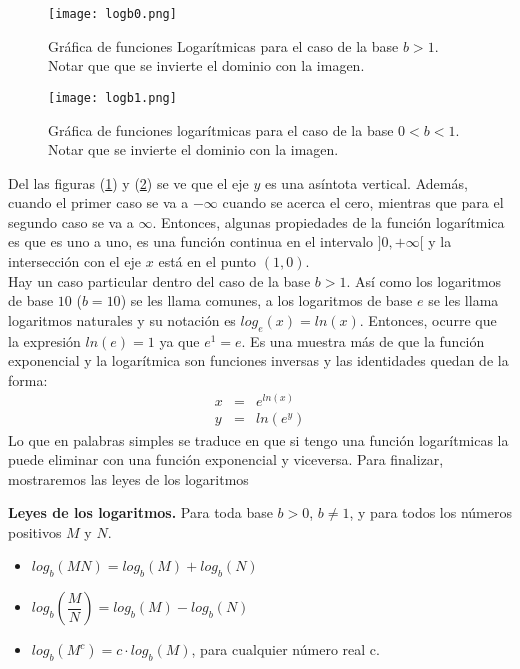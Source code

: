  \begin{center}
\begin{figure}[h!]
\centering
\texttt{[image: logb0.png]}
\caption[Gráfica de funciones logarítmicas para el caso de la base $b>1$]{Gráfica de funciones Logarítmicas para el caso de la base $b>1$. Notar que que se invierte el dominio con la imagen.} \label{logb0}
\end{figure}
\end{center}

 \begin{center}
\begin{figure}[h!]
\centering
\texttt{[image: logb1.png]}
\caption[Gráfica de funciones logarítmicas para el caso de la base $0<b<1$]{Gráfica de funciones logarítmicas para el caso de la base $0<b<1$. Notar que se invierte el dominio con la imagen.} \label{logb1}
\end{figure}
\end{center}

Del las figuras (\ref{logb0}) y (\ref{logb1}) se ve que el eje $y$ es una asíntota vertical. Además, cuando el primer caso se va a $-\infty$ cuando se acerca el cero, mientras que para el segundo caso se va a $\infty$. Entonces, algunas propiedades de la función logarítmica es que es uno a uno, es una función continua en el intervalo $]0,+\infty[$ y la intersección con el eje $x$ está en el punto $(1,0)$.\\

Hay un caso particular dentro del caso de la base $b>1$. Así como los logaritmos de base $10$ ($b=10$) se les llama comunes, a los logaritmos de base $e$ se les llama logaritmos naturales y su notación es $log_{e}(x)=ln(x)$. Entonces, ocurre que la expresión $ln(e)=1$ ya que $e^{1}=e$. Es una muestra más de que la función exponencial y la logarítmica son funciones inversas y las identidades quedan de la forma:
\begin{eqnarray}
x&=&e^{ln(x)}\\
y&=&ln(e^{y})
\end{eqnarray}
Lo que en palabras simples se traduce en que si tengo una función logarítmicas la puede eliminar con una función exponencial y viceversa. Para finalizar, mostraremos las leyes de los logaritmos

\begin{mydef}
\textbf{Leyes de los logaritmos. } Para toda base $b>0$, $b\neq 1$, y para todos los números positivos $M$ y $N$.
\begin{itemize}
	\item $log_{b}(MN)=log_{b}(M)+log_{b}(N)$
	\item $log_{b}\left(\dfrac{M}{N}\right)=log_{b}(M)-log_{b}(N)$
	\item $log_{b}(M^{c})=c\cdot log_{b}(M)$, para cualquier número real c.\\
\end{itemize}
\end{mydef}

